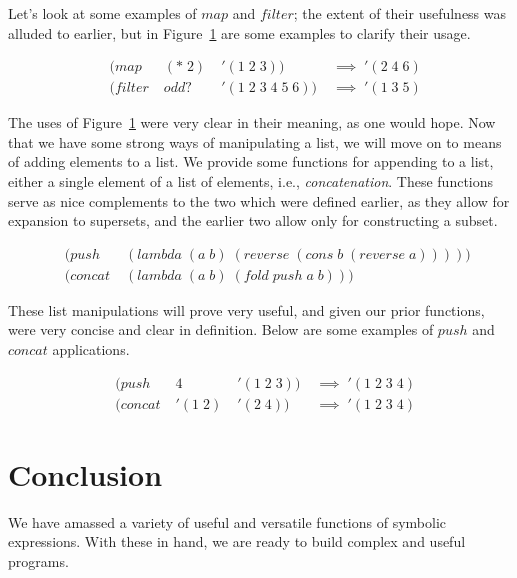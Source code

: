 Let's look at some examples of $map$ and $filter$; the extent of their
usefulness was alluded to earlier, but in Figure~\ref{fig:mapAndFilterExamples}
are some examples to clarify their usage.

\begin{figure}[htp]
\caption{}\label{fig:mapAndFilterExamples}
\begin{align*}
& (map \; &(* \; 2) \; &'(1 \; 2 \; 3)) \; &\implies \; '(2 \; 4 \; 6)
\\& (filter \; &odd? \; &'(1 \; 2 \; 3 \; 4 \; 5 \; 6)) \; &\implies \; '(1 \; 3 \; 5)
\end{align*}
\end{figure}

The uses of Figure~\ref{fig:mapAndFilterExamples} were very clear in their
meaning, as one would hope. Now that we have some strong ways of manipulating a
list, we will move on to means of adding elements to a list. We provide some
functions for appending to a list, either a single element of a list of
elements, i.e., \emph{concatenation}. These functions serve as nice complements to
the two which were defined earlier, as they allow for expansion to supersets, and
the earlier two allow only for constructing a subset.

\begin{figure}[htp]
\caption{}\label{fig:pushAndConcatDefs}
\begin{align*}
& (push \; &(lambda \; (a \; b) \; (reverse \; (cons \; b \; (reverse \; a)))))
\\& (concat \; &(lambda \; (a \; b) \; (fold \; push \; a \; b)))
\end{align*}
\end{figure}

These list manipulations will prove very useful, and given our prior functions, 
were very concise and clear in definition. Below are some examples of $push$ and 
$concat$ applications.

\begin{figure}[htp]
\caption{}\label{fig:pushAndConcatExamples}
\begin{align*}
& (push \; &4 \; &'(1 \; 2 \; 3)) \; &\implies \; '(1 \; 2 \; 3 \; 4)
\\& (concat \; &'(1 \; 2) \; &'(2 \; 4)) \; &\implies \; '(1 \; 2 \; 3 \; 4)
\end{align*}
\end{figure}

\section{Conclusion}
We have amassed a variety of useful and versatile functions of symbolic 
expressions. With these in hand, we are ready to build complex and useful 
programs.
